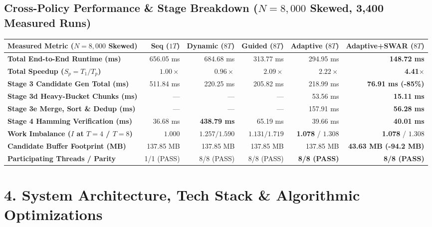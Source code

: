 \documentclass[10pt,a4paper]{article}
\renewcommand{\_}{\textunderscore\allowbreak}
\begin{document}
\subsection*{Cross-Policy Performance \& Stage Breakdown ($N = 8,000$ Skewed, 3,400 Measured Runs)}

\begingroup
\footnotesize
\setlength{\tabcolsep}{4.8pt}
\renewcommand{\arraystretch}{1.20}
\begin{tabular}{@{} L{0.35\textwidth} r r r r r @{}}
    \toprule
    \textbf{Measured Metric ($N = 8,000$ Skewed)} & \textbf{Seq ($1T$)} & \textbf{Dynamic ($8T$)} & \textbf{Guided ($8T$)} & \textbf{Adaptive ($8T$)} & \textbf{Adaptive+SWAR ($8T$)} \\
    \midrule
    \textbf{Total End-to-End Runtime (ms)} & 656.05 ms & 684.68 ms & 313.77 ms & 294.95 ms & \textbf{\color{successgreen}148.72 ms} \\
    \textbf{Total Speedup ($S_p = T_1 / T_p$)} & $1.00\times$ & $0.96\times$ & $2.09\times$ & $2.22\times$ & \textbf{\color{successgreen}4.41$\times$} \\
    \textbf{Stage 3 Candidate Gen Total (ms)} & 511.84 ms & 220.25 ms & 205.82 ms & 218.99 ms & \textbf{\color{successgreen}76.91 ms (-85\%)} \\
    \textbf{Stage 3d Heavy-Bucket Chunks (ms)} & --- & --- & --- & 53.56 ms & \textbf{\color{successgreen}15.11 ms} \\
    \textbf{Stage 3e Merge, Sort \& Dedup (ms)} & --- & --- & --- & 157.91 ms & \textbf{\color{successgreen}56.28 ms} \\
    \textbf{Stage 4 Hamming Verification (ms)} & 36.68 ms & \textcolor{dangerred}{\textbf{438.79 ms}} & 65.19 ms & 39.66 ms & \textbf{40.01 ms} \\
    \textbf{Work Imbalance ($I$ at $T=4$ / $T=8$)} & $1.000$ & $1.257 / 1.590$ & $1.131 / 1.719$ & \textbf{\color{successgreen}1.078} / $1.308$ & \textbf{\color{successgreen}1.078} / $1.308$ \\
    \textbf{Candidate Buffer Footprint (MB)} & 137.85 MB & 137.85 MB & 137.85 MB & 137.85 MB & \textbf{\color{successgreen}43.63 MB (-94.2 MB)} \\
    \textbf{Participating Threads / Parity} & 1/1 (PASS) & 8/8 (PASS) & 8/8 (PASS) & \textbf{8/8 (PASS)} & \textbf{8/8 (PASS)} \\
    \bottomrule
\end{tabular}
\endgroup

\section{4. System Architecture, Tech Stack \& Algorithmic Optimizations}
\end{document}
